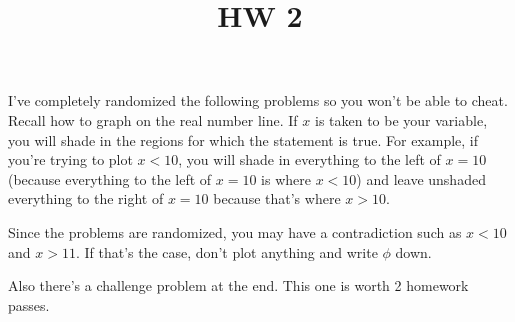 \documentclass[12pt]{article}
\begin{document}
			\title{HW 2}
			\author{}
			\date{}
			\maketitle
I've completely randomized the following problems so you won't be able to cheat. Recall how to 
graph on the real number line. If $x$ is taken
to be your variable, you will shade in the regions for which the statement is true. For example, if you're
trying to plot $x < 10$, you will shade in everything to the left of $x = 10$ (because everything to the 
left of $x = 10$ is where $x < 10$) and leave unshaded everything to the right of $x = 10$ because that's where
$x > 10$.

Since the problems are randomized, you may have a contradiction such as $x < 10$ and $x > 11$. If that's the case,
don't plot anything and write $\phi$ down.

Also there's a challenge problem at the end. This one is worth 2 homework passes.
\end{document}
